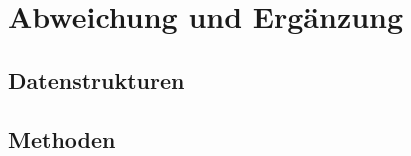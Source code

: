 \chapter{Abweichung und Ergänzung}\label{ch:abweichung-und-ergaenzung}

\section{Datenstrukturen}
\section{Methoden}